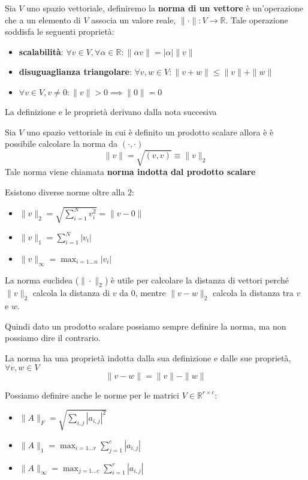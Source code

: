 \begin{definizione} 
    Sia $V$ uno spazio vettoriale, definiremo la \textbf{norma di un vettore} è un'operazione
    che a un elemento di $V$ associa un valore reale, $\|\cdot\|: V \rightarrow \mathbb{R}$.
    Tale operazione soddisfa le seguenti proprietà:
    \begin{itemize}
        \item \textbf{scalabilità}: $\forall v \in V,\forall \alpha \in \mathbb{R}: \|\alpha v\| = |\alpha | \|v\|$
        \item \textbf{disuguaglianza triangolare}: $\forall v,w \in V: \|v+w\| \le \|v\| + \|w\|$
        \item $\forall v \in V, v\ne 0: \|v\| > 0\implies \|0\| = 0$
    \end{itemize}
\end{definizione}
La definizione e le proprietà derivano dalla nota succesiva
\begin{nota} 
    Sia $V$ uno spazio vettoriale in cui è definito un prodotto scalare allora è
    è possibile calcolare la norma da $(\cdot, \cdot)$ 
    $$\|v\| = \sqrt{(v,v)}  \equiv \|v\|_2$$
    Tale norma viene chiamata \textbf{norma indotta dal prodotto scalare }
\end{nota}

\begin{nota}
    Esistono diverse norme oltre alla $2$:
    \begin{itemize}
        \item $\|v\|_2 = \sqrt{\sum_{i=1}^{N}v_i^2} = \|v-0\|$ 
        \item $\|v\|_1 = \sum_{i=1}^{N}|v_i|$ 
        \item $\|v\|_\infty = \max_{i= 1\dots n}|v_i|$ 
    \end{itemize}
\end{nota}
La norma euclidea ($\|\cdot\|_2$) è utile per calcolare la distanza di vettori perché
$\|v\|_2$ calcola la distanza di $v$ da $0$, mentre $\|v-w\|_2$ calcola la distanza tra
$v$ e $w$.

Quindi dato un prodotto scalare possiamo sempre definire la norma, ma non possiamo 
dire il contrario.
\begin{nota}
    La norma ha una proprietà indotta dalla sua definizione e dalle sue proprietà,
    $\forall v,w \in V$ 
    $$\|v-w\| = \|v\| -\|w\|$$
\end{nota}

Possiamo definire anche le norme per le matrici $V\in \mathbb{R}^{r\times c}$:
\begin{itemize}
    \item $\|A\|_F = \sqrt{\sum_{i,j} |a_{i,j}|^2}$
    \item $\|A\|_1 = \max_{i=1\dots r}{\sum_{j=1}^{c} |a_{i,j}|}$
    \item $\|A\|_\infty = \max_{j=1\dots c}{\sum_{i=1}^{r} |a_{i,j}|}$
\end{itemize}

